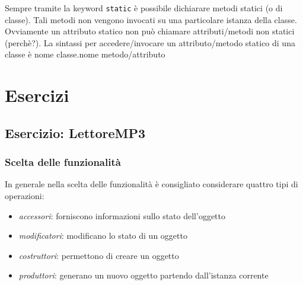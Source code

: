 \documentclass{article}
\begin{document}
Sempre tramite la keyword \texttt{static}
è possibile dichiarare metodi statici (o di classe).
Tali metodi non vengono invocati su una particolare
istanza della classe.
Ovviamente un attributo statico non può chiamare
attributi/metodi non statici (perchè?).
La sintassi per accedere/invocare un attributo/metodo statico
di una classe è
nome classe.nome metodo/attributo

\section{Esercizi}


\subsection{Esercizio: LettoreMP3}



\subsubsection{Scelta delle funzionalit\`a}
In generale nella scelta delle funzionalit\`a \`e consigliato considerare quattro tipi di operazioni:
\begin{itemize}
\item \emph{accessori}: forniscono informazioni sullo stato dell'oggetto
\item \emph{modificatori}: modificano lo stato di un oggetto
\item \emph{costruttori}:  permettono di creare un oggetto
\item \emph{produttori}: generano un nuovo oggetto partendo dall'istanza corrente
\end{itemize}
\end{document}
